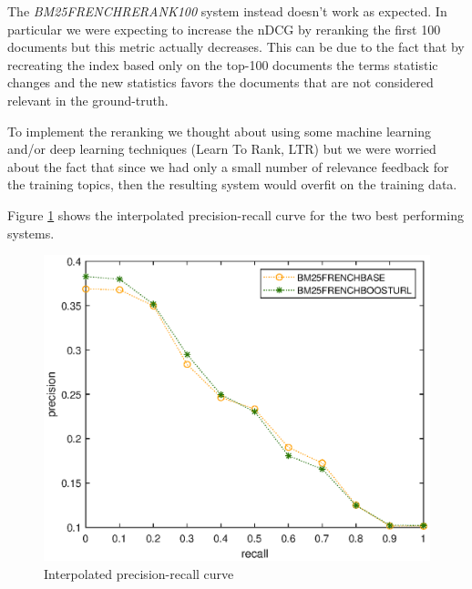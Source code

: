 \par The \textit{BM25FRENCHRERANK100} system instead doesn't work as expected. In particular we were expecting to increase the nDCG by reranking the first 100 documents but this metric actually decreases. This can be due to the fact that by recreating the index based only on the top-100 documents the terms statistic changes and the new statistics favors the documents that are not considered relevant in the ground-truth.
\par To implement the reranking we thought about using some machine learning and/or deep learning techniques (Learn To Rank, LTR) but we were worried about the fact that since we had only a small number of relevance feedback for the training topics, then the resulting system would overfit on the training data.
\par
Figure \ref{fig:prcurve} shows the interpolated precision-recall curve for the two best performing systems.
\begin{figure}[h]
    \centering
    \includegraphics[scale=0.8]{figure/curve.eps}
    \caption{Interpolated precision-recall curve}
    \label{fig:prcurve}
\end{figure}

